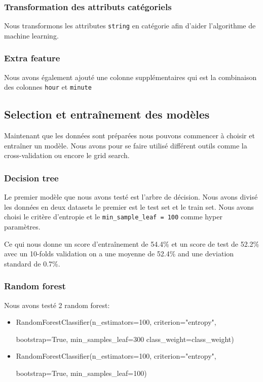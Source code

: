 
\subsubsection{Transformation des attributs catégoriels}
Nous transformons les attributes \lstinline!string! en catégorie afin d'aider l'algorithme de machine learning.

\subsubsection{Extra feature}
Nous avons également ajouté une colonne supplémentaires qui est la combinaison des colonnes \lstinline!hour! et \lstinline!minute!


\subsection{Selection et entraînement des modèles}
Maintenant que les données sont préparées nous pouvons commencer à choisir et entraîner un modèle. Nous avons pour se faire utilisé différent outils comme la cross-validation ou encore le grid search.

\subsubsection{Decision tree}
Le premier modèle que nous avons testé est l'arbre de décision. Nous avons divisé les données en deux datasets le premier est le test set et le train set. Nous avons choisi le critère d'entropie et le \lstinline!min_sample_leaf = 100! comme hyper paramètres.

Ce qui nous donne un score d'entraînement de 54.4\% et un score de test de 52.2\% avec un 10-folds validation on a une moyenne de 52.4\% and une deviation standard de 0.7\%.

\subsubsection{Random forest}
Nous avons testé 2 random forest:
\begin{itemize}
    \item RandomForestClassifier(n\_estimators=100, criterion="entropy",
    
    bootstrap=True, min\_samples\_leaf=300 class\_weight=class\_weight)
    \item RandomForestClassifier(n\_estimators=100, criterion="entropy",
    
    bootstrap=True, min\_samples\_leaf=100)
\end{itemize}

